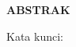 \clearpage
{}
{}
\begin{center}
    \textbf{ABSTRAK}\\[0.5cm]
\end{center}

\lipsum[2-4]

\noindent Kata kunci: \katakunci